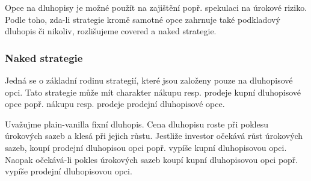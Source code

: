 \documentclass[a4paper]{book}
\begin{document}
Opce na dluhopisy je možné použít na zajištění popř. spekulaci na úrokové riziko. Podle toho, zda-li strategie kromě samotné opce zahrnuje také podkladový dluhopis či nikoliv, rozlišujeme covered a naked strategie.

\subsubsection{Naked strategie}

Jedná se o základní rodinu strategií, které jsou založeny pouze na dluhopisové opci. Tato strategie může mít charakter nákupu resp. prodeje kupní dluhopisové opce popř. nákupu resp. prodeje prodejní dluhopisové opce.

Uvažujme plain-vanilla fixní dluhopis. Cena dluhopisu roste při poklesu úrokových sazeb a klesá při jejich růstu. Jestliže investor očekává růst úrokových sazeb, koupí prodejní dluhopisou opci popř. vypíše kupní dluhopisovou opci. Naopak očekává-li pokles úrokových sazeb koupí kupní dluhopisovou opci popř. vypíše prodejní dluhopisovou opci.
\end{document}
